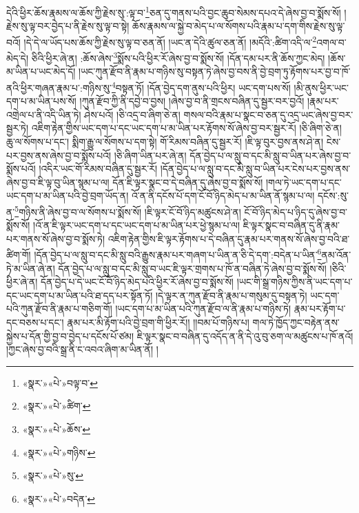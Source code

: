 དེའི་ཕྱིར་ཆོས་རྣམས་ལ་ཆོས་ཀྱི་རྗེས་སུ་:ལྟ་བ་\footnote{«སྣར་»«པེ་»བལྟ་བ་}ཅན་དུ་གནས་པའི་བྱང་ཆུབ་སེམས་དཔའ་དེ་ཞེས་བྱ་བ་སྨོས་སོ། །རྗེས་སུ་ལྟ་བར་བྱེད་པ་ནི་རྗེས་སུ་ལྟ་བ་སྟེ། ཆོས་རྣམས་ལ་སྐྱེ་བ་མེད་པ་ལ་སོགས་པའི་རྣམ་པ་དག་གིས་རྗེས་སུ་ལྟ་བའོ། །དེ་དེ་ལ་ཡོད་པས་ཆོས་ཀྱི་རྗེས་སུ་ལྟ་བ་ཅན་ནོ། །ཡང་ན་དེའི་ཚུལ་ཅན་ནོ། །མདོའི་:ཚིག་འདི་ལ་\footnote{«སྣར་»«པེ་»ཚིག་}འགལ་བ་མེད་དེ། ཅིའི་ཕྱིར་ཞེ་ན། :ཆོས་ཞེས་\footnote{«སྣར་»«པེ་»ཆོས་}སྨོས་པའི་ཕྱིར་རོ་ཞེས་བྱ་བ་སྨོས་སོ། །དོན་དམ་པར་ནི་ཆོས་ཀྱང་མེད། །ཆོས་མ་ཡིན་པ་ཡང་མེད་དོ། །ཡང་ཀུན་རྫོབ་ནི་རྣམ་པ་གཉིས་སུ་བསྟན་ཏེ་ཞེས་བྱ་བས་ནི་བྱེ་བྲག་ཏུ་རྟོགས་པར་བྱ་བ་ཁོ་ནའི་ཕྱིར་གཞན་རྣམ་པ་:གཉིས་སུ་\footnote{«སྣར་»«པེ་»གཉིས་}བསྟན་ཏོ། །དོན་བྱེད་དག་ནུས་པའི་ཕྱིར། ཡང་དག་པས་སོ། །མི་ནུས་ཕྱིར་ཡང་དག་པ་མ་ཡིན་པས་སོ། །ཀུན་རྫོབ་ཀྱི་ནི་དབྱེ་བ་བྱས། །ཞེས་བྱ་བ་ནི་གྲངས་བཞིན་དུ་སྦྱར་བར་བྱའོ། །རྣམ་པར་འགྲེལ་པ་ནི་འདི་ཡིན་ཏེ། ཤེས་པའོ། །ཅི་འདྲ་བ་ཞིག་ཅེ་ན། གསལ་བའི་རྣམ་པ་སྣང་བ་ཅན་དུ་འདྲ་ཡང་ཞེས་བྱ་བར་སྦྱར་ཏེ། འཇིག་རྟེན་གྱིས་ཡང་དག་པ་དང་ཡང་དག་པ་མ་ཡིན་པར་རྟོགས་སོ་ཞེས་བྱ་བར་སྦྱར་རོ། །ཅི་ཞིག་ཅེ་ན། ཆུ་ལ་སོགས་པ་དང་། སྨིག་རྒྱུ་ལ་སོགས་པ་དག་སྟེ། གོ་རིམས་བཞིན་དུ་སྦྱར་རོ། །ཇི་ལྟ་བུར་བྱས་ནས་ཤེ་ན། ངེས་པར་བྱས་ནས་ཞེས་བྱ་བ་སྨོས་པའོ། །ཅི་ཞིག་ཡིན་པར་ཞེ་ན། དོན་བྱེད་པ་ལ་སླུ་བ་དང་མི་སླུ་བ་ཡིན་པར་ཞེས་བྱ་བ་སྨོས་པའོ། །འདིར་ཡང་གོ་རིམས་བཞིན་དུ་སྦྱར་རོ། །དོན་བྱེད་པ་ལ་སླུ་བ་དང་མི་སླུ་བ་ཡིན་པར་ངེས་པར་བྱས་ནས་ཞེས་བྱ་བ་ཇི་ལྟ་བུ་ཡིན་སྙམ་པ་ལ། དོན་ཇི་ལྟར་སྣང་བ་དེ་བཞིན་དུ་ཞེས་བྱ་བ་སྨོས་སོ། །གལ་ཏེ་ཡང་དག་པ་དང་ཡང་དག་པ་མ་ཡིན་པའི་བྱེ་བྲག་ཡོད་ན། འོ་ན་ནི་དངོས་པོ་དག་ངོ་བོ་ཉིད་མེད་པ་མ་ཡིན་ནོ་སྙམ་པ་ལ། དངོས་:སུ་ན་\footnote{«སྣར་»«པེ་»སུ་}གཉིས་ནི་ཞེས་བྱ་བ་ལ་སོགས་པ་སྨོས་སོ། །ཇི་ལྟར་ངོ་བོ་ཉིད་མཚུངས་ཤེ་ན། ངོ་བོ་ཉིད་མེད་པ་ཉིད་དུ་ཞེས་བྱ་བ་སྨོས་སོ། །འོ་ན་ཇི་ལྟར་ཡང་དག་པ་དང་ཡང་དག་པ་མ་ཡིན་པར་ཕྱེ་སྙམ་པ་ལ། ཇི་ལྟར་སྣང་བ་བཞིན་དུ་ནི་རྣམ་པར་གནས་སོ་ཞེས་བྱ་བ་སྨོས་ཏེ། འཇིག་རྟེན་གྱིས་ཇི་ལྟར་རྟོགས་པ་དེ་བཞིན་དུ་རྣམ་པར་གནས་སོ་ཞེས་བྱ་བའི་ཐ་ཚིག་གོ། །དོན་བྱེད་པ་ལ་སླུ་བ་དང་མི་སླུ་བའི་རྒྱུས་རྣམ་པར་གཞག་པ་ཡིན་ན་ཅི་དེ་དག་:བདེན་པ་ཡིན་\footnote{«སྣར་»«པེ་»བདེན་}ནམ་འོན་ཏེ་མ་ཡིན་ཞེ་ན། དོན་བྱེད་པ་ལ་སླུ་བ་དང་མི་སླུ་བ་ཡང་ཇི་ལྟར་གྲགས་པ་ཁོ་ན་བཞིན་ཏེ་ཞེས་བྱ་བ་སྨོས་སོ། །ཅིའི་ཕྱིར་ཞེ་ན། དོན་བྱེད་པ་དེ་ཡང་ངོ་བོ་ཉིད་མེད་པའི་ཕྱིར་རོ་ཞེས་བྱ་བ་སྨོས་སོ། །ཡང་གི་སྒྲ་གཉིས་ཀྱིས་ནི་ཡང་དག་པ་དང་ཡང་དག་པ་མ་ཡིན་པའི་ཐ་དད་པར་སྟོན་ཏོ། །དེ་ལྟར་ན་ཀུན་རྫོབ་ནི་རྣམ་པ་གསུམ་དུ་བསྟན་ཏེ། ཡང་དག་པའི་ཀུན་རྫོབ་ནི་རྣམ་པ་གཅིག་གོ། །ཡང་དག་པ་མ་ཡིན་པའི་ཀུན་རྫོབ་ལ་ནི་རྣམ་པ་གཉིས་ཏེ། རྣམ་པར་རྟོག་པ་དང་བཅས་པ་དང་། རྣམ་པར་མི་རྟོག་པའི་བྱེ་བྲག་གི་ཕྱིར་རོ།། །།བམ་པོ་གཉིས་པ། གལ་ཏེ་ཁྱོད་ཀྱང་བརྟེན་ནས་སྐྱེས་པ་དོན་གྱི་བྱ་བ་བྱེད་པ་དངོས་པོ་ཙམ། ཇི་ལྟར་སྣང་བ་བཞིན་དུ་འདོད་ན་ནི་དེ་འུ་བུ་ཅག་ལ་མཚུངས་པ་ཁོ་ནའོ། །ཀྱང་ཞེས་བྱ་བའི་སྒྲ་ནི་ང་འབའ་ཞིག་མ་ཡིན་ནོ། །
